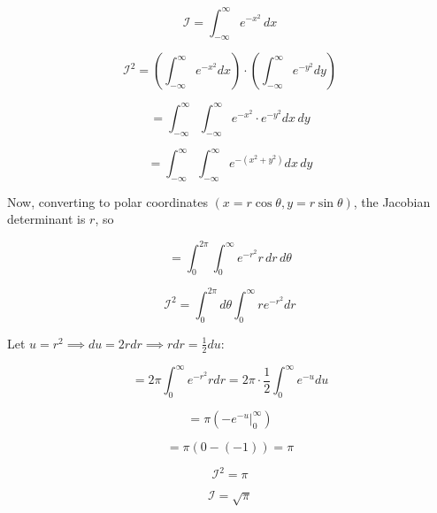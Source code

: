 \documentclass{article}
\begin{document}
\[
\mathcal{I} = \int_{-\infty}^\infty e^{-x^2} \, dx
\]

\[
\mathcal{I}^2 = \left( \int_{-\infty}^\infty e^{-x^2} dx \right) \cdot \left( \int_{-\infty}^\infty e^{-y^2} dy \right)
\]

\[
= \int_{-\infty}^\infty \int_{-\infty}^\infty e^{-x^2} \cdot e^{-y^2} dx \, dy
\]

\[
= \int_{-\infty}^\infty \int_{-\infty}^\infty e^{-(x^2+y^2)} dx \, dy
\]

Now, converting to polar coordinates $(x = r\cos\theta, y = r\sin\theta)$, the Jacobian determinant is $r$, so

\[
= \int_0^{2\pi} \int_0^\infty e^{-r^2} r \, dr \, d\theta
\]

\[
\mathcal{I}^2 = \int_0^{2\pi} d\theta \int_0^\infty r e^{-r^2} dr
\]

Let $u = r^2 \implies du = 2r dr \implies r dr = \frac{1}{2}du$:

\[
= 2\pi \int_0^\infty e^{-r^2} r dr = 2\pi \cdot \frac{1}{2} \int_0^\infty e^{-u} du
\]

\[
= \pi \left( - e^{-u} \Big|_0^\infty \right)
\]

\[
= \pi \left( 0 - (-1) \right) = \pi
\]

\[
\mathcal{I}^2 = \pi
\]

\[
\mathcal{I} = \sqrt{\pi}
\]
\end{document}
